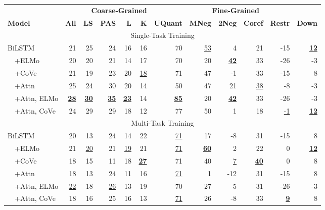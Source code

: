 \begin{table*}[t]
\centering \fontsize{8.4}{10.1}\selectfont \setlength{\tabcolsep}{0.5em}
\begin{tabular}{lr@{\hskip 3em}rrrr@{\hskip 3em}rrrrrr}
 \toprule
 && \multicolumn{4}{l}{\textbf{~~Coarse-Grained}} & \multicolumn{6}{c}{\textbf{Fine-Grained}}\\ %
\textbf{Model} & \textbf{All} & \textbf{LS} & \textbf{PAS} & \textbf{L} & \textbf{K} & \textbf{UQuant} & \textbf{MNeg} & \textbf{2Neg} & \textbf{Coref} & \textbf{Restr} & \textbf{Down} \\
\midrule
\multicolumn{12}{c}{Single-Task Training} \\
\midrule
BiLSTM & 21 & 25 & 24 & 16 & 16 & 70 & \underline{53} & 4 & 21 & -15 & \textbf{\underline{12}} \\
~~+ELMo & 20 & 20 & 21 & 14 & 17 & 70 & 20 & \textbf{\underline{42}} & 33 & -26 & -3 \\
~~+CoVe & 21 & 19 & 23 & 20 & \underline{18} & 71 & 47 & -1 & 33 & -15 & 8 \\
~~+Attn & 25 & 24 & 30 & 20 & 14 & 50 & 47 & 21 & \underline{38} & -8 & -3 \\
~~+Attn, ELMo & \textbf{\underline{28}} & \textbf{\underline{30}} & \textbf{\underline{35}} & \textbf{\underline{23}} & 14 & \textbf{\underline{85}} & 20 & \textbf{\underline{42}} & 33 & -26 & -3 \\
~~+Attn, CoVe & 24 & 29 & 29 & 18 & 12 & 77 & 50 & 1 & 18 & \underline{-1} & \textbf{\underline{12}} \\

\midrule
\multicolumn{12}{c}{Multi-Task Training} \\
\midrule

BiLSTM & 20 & 13 & 24 & 14 & 22 & \underline{71} & 17 & -8 & 31 & -15 & 8 \\
~~+ELMo & 21 & \underline{20} & 21 & \underline{19} & 21 & \underline{71} & \textbf{\underline{60}} & 2 & 22 & 0 & \textbf{\underline{12}} \\
~~+CoVe & 18 & 15 & 11 & 18 & \textbf{\underline{27}} & 71 & 40 & \underline{7} & \textbf{\underline{40}} & 0 & 8 \\
~~+Attn & 18 & 13 & 24 & 11 & 16 & \underline{71} & 1 & -12 & 31 & -15 & 8 \\
~~+Attn, ELMo & \underline{22} & 18 & \underline{26} & 13 & 19 & 70 & 27 & 5 & 31 & -26 & -3 \\
~~+Attn, CoVe & 18 & 16 & 25 & 16 & 13 & \underline{71} & 26 & -8 & 33 & \textbf{\underline{9}} & 8 \\


\end{tabular}
\end{table*}
